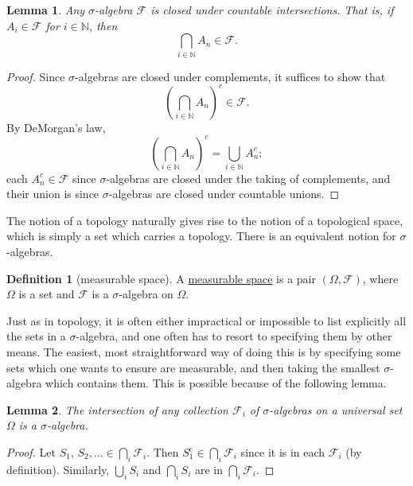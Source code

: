\documentclass[a4paper,12pt]{scrreprt}
\newcommand{\N}{\mathbb{N}}
\newcommand{\defn}[1]{\ul{#1}}
\theoremstyle{definition}
\newtheorem{definition}{Definition}[section]
\theoremstyle{plain}
\newtheorem{lemma}{Lemma}[section]
\theoremstyle{remark}
\begin{document}
\begin{lemma}
  \label{lemma:sigmaalgebrasclosedundercountableintersections}
  Any $\sigma$-algebra $\mathcal{F}$ is closed under countable intersections. That is, if $A_{i} \in \mathcal{F}$ for $i \in \N$, then
  \begin{equation*}
    \bigcap_{i \in \N} A_{n} \in \mathcal{F}.
  \end{equation*}
\end{lemma}
\begin{proof}
  Since $\sigma$-algebras are closed under complements, it suffices to show that
  \begin{equation*}
    {\left( \bigcap_{i \in \N} A_{n} \right)}^{c} \in \mathcal{F}.
  \end{equation*}
  By DeMorgan's law,
  \begin{equation*}
    {\left( \bigcap_{i \in \N} A_{n} \right)}^{c} = \bigcup_{i \in \N} A^{c}_{n};
  \end{equation*}
  each $A^{c}_{n} \in \mathcal{F}$ since $\sigma$-algebras are closed under the taking of complements, and their union is since $\sigma$-algebras are closed under countable unions.
\end{proof}

The notion of a topology naturally gives rise to the notion of a topological space, which is simply a set which carries a topology. There is an equivalent notion for $\sigma$-algebras.

\begin{definition}[measurable space]
  \label{def:measurablespace}
  A \defn{measurable space} is a pair $(\Omega, \mathcal{F})$, where $\Omega$ is a set and $\mathcal{F}$ is a $\sigma$-algebra on $\Omega$.
\end{definition}

Just as in topology, it is often either impractical or impossible to list explicitly all the sets in a $\sigma$-algebra, and one often has to resort to specifying them by other means. The easiest, most straightforward way of doing this is by specifying some sets which one wants to ensure are measurable, and then taking the smallest $\sigma$-algebra which contains them. This is possible because of the following lemma.

\begin{lemma}
  The intersection of \emph{any} collection $\mathcal{F}_{i}$ of $\sigma$-algebras on a universal set $\Omega$ is a $\sigma$-algebra.
\end{lemma}

\begin{proof}
  Let $S_{1}$, $S_{2}, \ldots \in \bigcap_{i} \mathcal{F}_{i}$. Then $S_{1}^{\mathrm{c}} \in \bigcap_{i} \mathcal{F}_{i}$ since it is in each $\mathcal{F}_{i}$ (by definition). Similarly, $\bigcup_{i} S_{i}$ and $\bigcap_{i} S_{i}$ are in $\bigcap_{i} \mathcal{F}_{i}$.
\end{proof}
\end{document}
